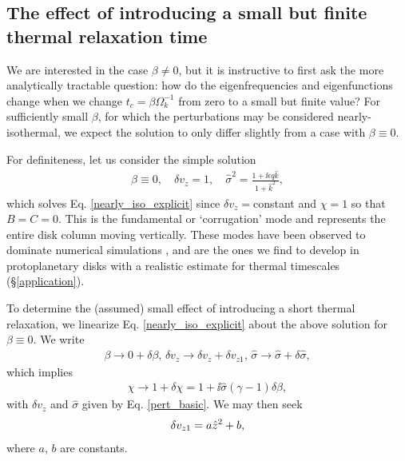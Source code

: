 \subsection{The effect of introducing a small but finite
  thermal relaxation time}\label{relax_pert}
We are interested in the case $\beta\neq 0$, but it is instructive to
first ask  the more analytically tractable question: how 
do the eigenfrequencies and eigenfunctions change when we change
$t_c=\beta\Omega_k^{-1}$ from zero to a small but finite value? For 
sufficiently small $\beta$, for which the perturbations may be 
considered nearly-isothermal, we expect the solution to only
differ slightly from a case with $\beta\equiv 0$. 


For definiteness, let us consider the simple solution 
\begin{align}
  \beta\equiv 0, \quad \delta v_z = 1,\quad \hat{\sigma}^2 = \frac{1 +
  \ii\epsilon q \hat{k}}{1+\hat{k}^2}, \label{pert_basic} 
\end{align}
which solves Eq. \ref{nearly_iso_explicit} since $\delta
v_z=$constant and $\chi=1$ so that $B=C=0$. 
This is the fundamental or `corrugation' mode and represents
the entire disk column moving vertically. These modes have been
observed to dominate numerical simulations \citep{nelson13,stoll14},
and are the ones we find to develop in protoplanetary disks
with a realistic estimate for thermal timescales
(\S\ref{application}). 

To determine the (assumed) small effect of introducing a short thermal
relaxation, we linearize Eq. \ref{nearly_iso_explicit} about the above
solution for $\beta\equiv0$. We write 
\begin{align}\label{nearly_iso_pert}
  \beta \to 0 + \delta\beta,\, \delta v_z\to \delta v_z+\delta
  v_{z1},\,\hat{\sigma} \to \hat{\sigma} + \delta\hat{\sigma}, 
\end{align}
which implies 
\begin{align}
  \chi \to 1 + \delta\chi = 1 + \ii \hat{\sigma}\left(\gamma-1\right)\delta\beta,
\end{align}
with $\delta v_z$ and $\hat{\sigma}$ given by Eq. \ref{pert_basic}. We
may then seek  
\begin{align}
  \delta v_{z1} = a \hat{z}^2 + b,
\end{align}
where $a$, $b$ are constants. 

